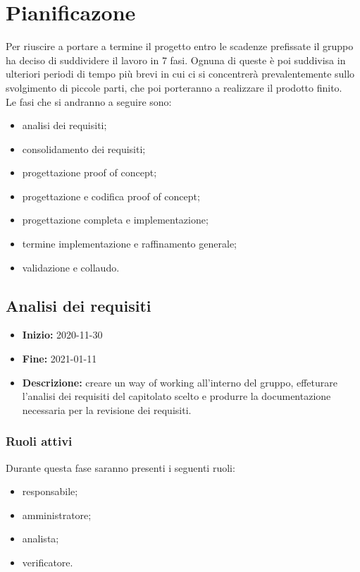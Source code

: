 \section{Pianificazone} \label{_pianificazione}
Per riuscire a portare a termine il progetto entro le scadenze prefissate il gruppo ha deciso di suddividere il lavoro in 7 fasi. Ognuna di queste è poi suddivisa in ulteriori periodi di tempo più brevi in cui ci si concentrerà prevalentemente sullo svolgimento di piccole parti, che poi porteranno a realizzare il prodotto finito.\\
Le fasi che si andranno a seguire sono:
\begin{itemize}
    \item analisi dei requisiti;
    \item consolidamento dei requisiti;
    \item progettazione proof of concept;
    \item progettazione e codifica proof of concept;
    \item progettazione completa e implementazione;
    \item termine implementazione e raffinamento generale;
    \item validazione e collaudo.
\end{itemize}


\subsection{Analisi dei requisiti} \label{_pianificazioneAnalisiDeiRequisiti}
\begin{itemize}
    \item []\textbf{Inizio:} 2020-11-30
    \item []\textbf{Fine:} 2021-01-11
    \item []\textbf{Descrizione:} creare un way of working all'interno del gruppo, effeturare l'analisi dei requisiti del capitolato scelto e produrre la documentazione necessaria per la revisione dei requisiti.
\end{itemize}

\subsubsection{Ruoli attivi}
Durante questa fase saranno presenti i seguenti ruoli:
\begin{itemize}
    \item responsabile;
    \item amministratore;
    \item analista;
    \item verificatore.
\end{itemize}


